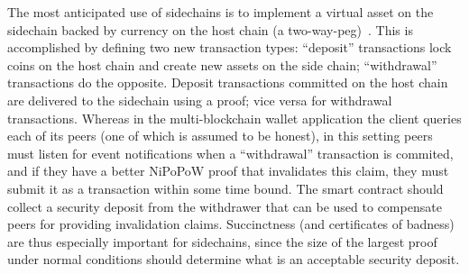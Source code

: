 The most anticipated use of sidechains is to implement a virtual asset on the
sidechain backed by currency on the host chain (a two-way-peg)~\cite{sidechains}. This is accomplished by defining two new transaction
types: ``deposit'' transactions lock coins on the host chain and create new
assets on the side chain; ``withdrawal'' transactions do the opposite. Deposit
transactions committed on the host chain are delivered to the sidechain using a
proof; vice versa for withdrawal transactions. Whereas in the multi-blockchain
wallet application the client queries each of its peers (one of which is assumed
to be honest), in this setting peers must listen for event notifications when a
``withdrawal'' transaction is commited, and if they have a better NiPoPoW proof
that invalidates this claim, they must submit it as a transaction within some
time bound. The smart contract should collect a security deposit from the
withdrawer that can be used to compensate peers for providing invalidation
claims. Succinctness (and certificates of badness) are thus especially important
for sidechains, since the size of the largest proof under normal conditions
should determine what is an acceptable security deposit.

